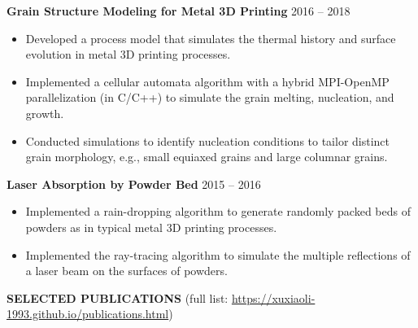 \documentclass[11pt, letterpaper]{article}
\begin{document}
\vspace{3pt}

\textbf{Grain Structure Modeling for Metal 3D Printing} \hfill 2016 -- 2018
\begin{itemize}[leftmargin=*, labelsep=5mm]
   \item Developed a process model that simulates the thermal history and surface evolution in metal
      3D printing processes.
   \item Implemented a cellular automata algorithm with a hybrid MPI-OpenMP parallelization (in
      C/C++) to simulate the grain melting, nucleation, and growth. 
   \item Conducted simulations to identify nucleation conditions to tailor distinct grain
      morphology, e.g., small equiaxed grains and large columnar grains.
\end{itemize}

\vspace{3pt}

\textbf{Laser Absorption by Powder Bed} \hfill 2015 -- 2016
\begin{itemize}[leftmargin=*, labelsep=5mm]
   \item Implemented a rain-dropping algorithm to generate randomly packed beds of powders as in
      typical metal 3D printing processes.
   \item Implemented the ray-tracing algorithm to simulate the multiple reflections of a laser beam
      on the surfaces of powders.
\end{itemize}

\vspace{9pt}

\textbf{SELECTED PUBLICATIONS} \hfill (full list:  
\href{https://xuxiaoli-1993.github.io/publications.html}
{https://xuxiaoli-1993.github.io/publications.html})

\fullrule
\end{document}
